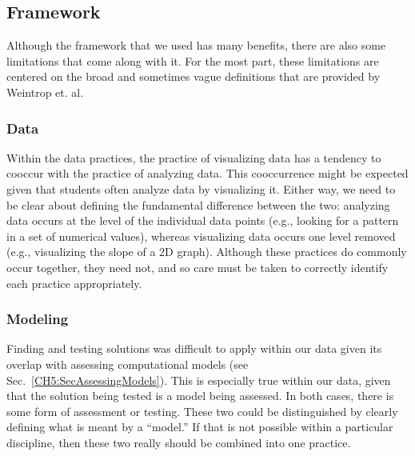 \documentclass{msuphddissertation}
\begin{document}
\begin{doublespace}
\subsection{Framework}

Although the framework that we used has many benefits, there are also some limitations that come along with it.  For the most part, these limitations are centered on the broad and sometimes vague definitions that are provided by Weintrop et. al.


\subsubsection{Data}

Within the data practices, the practice of visualizing data has a tendency to cooccur with the practice of analyzing data.  This cooccurrence might be expected given that students often analyze data by visualizing it.  Either way, we need to be clear about defining the fundamental difference between the two: analyzing data occurs at the level of the individual data points (e.g., looking for a pattern in a set of numerical values), whereas visualizing data occurs one level removed (e.g., visualizing the slope of a 2D graph).  Although these practices do commonly occur together, they need not, and so care must be taken to correctly identify each practice appropriately.

\subsubsection{Modeling}


Finding and testing solutions was difficult to apply within our data given its overlap with assessing computational models (see Sec.~\ref{CH5:SecAssessingModels}).  This is especially true within our data, given that the solution being tested is a model being assessed.  In both cases, there is some form of assessment or testing.  These two could be distinguished by clearly defining what is meant by a ``model.''  If that is not possible within a particular discipline, then these two really should be combined into one practice.


\end{doublespace}
\end{document}

